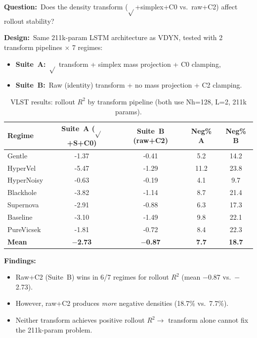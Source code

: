 \documentclass[11pt,letterpaper]{article}
\newcommand{\Rtwo}{R^2}
\newcommand{\regime}[1]{\textsf{#1}}
\begin{document}
\textbf{Question:}\ Does the density transform ($\sqrt{}$+simplex+C0 vs.\ raw+C2)
affect rollout stability?

\textbf{Design:}\ Same 211k-param LSTM architecture as VDYN, tested with 2 transform
pipelines $\times$ 7 regimes:
\begin{itemize}[nosep]
  \item \textbf{Suite~A:}\ $\sqrt{}$ transform + simplex mass projection + C0 clamping,
  \item \textbf{Suite~B:}\ Raw (identity) transform + no mass projection + C2 clamping.
\end{itemize}

\begin{table}[H]
\centering
\caption{VLST results: rollout $\Rtwo$ by transform pipeline (both use Nh=128, L=2, 211k params).}
\label{tab:vlst}
\small
\begin{tabular}{@{}l S[table-format=+1.3] S[table-format=+1.3] S[table-format=2.1] S[table-format=2.1] @{}}
\toprule
Regime & {Suite~A ($\sqrt{}$+S+C0)} & {Suite~B (raw+C2)} & {Neg\% A} & {Neg\% B} \\
\midrule
\regime{Gentle}     & -1.37 & -0.41 & 5.2  & 14.2 \\
\regime{HyperVel}   & -5.47 & -1.29 & 11.2 & 23.8 \\
\regime{HyperNoisy} & -0.63 & -0.19 & 4.1  & 9.7  \\
\regime{Blackhole}  & -3.82 & -1.14 & 8.7  & 21.4 \\
\regime{Supernova}  & -2.91 & -0.88 & 6.3  & 17.3 \\
\regime{Baseline}   & -3.10 & -1.49 & 9.8  & 22.1 \\
\regime{PureVicsek} & -1.81 & -0.72 & 8.4  & 22.3 \\
\midrule
\textbf{Mean}       & \textbf{$-$2.73} & \textbf{$-$0.87} & \textbf{7.7} & \textbf{18.7} \\
\bottomrule
\end{tabular}
\end{table}

\textbf{Findings:}
\begin{itemize}[nosep]
  \item Raw+C2 (Suite~B) wins in 6/7 regimes for rollout $\Rtwo$ (mean $-$0.87 vs.\ $-$2.73).
  \item However, raw+C2 produces \emph{more} negative densities (18.7\% vs.\ 7.7\%).
  \item Neither transform achieves positive rollout $\Rtwo \to$ transform alone cannot fix the 211k-param problem.
\end{itemize}
\end{document}
